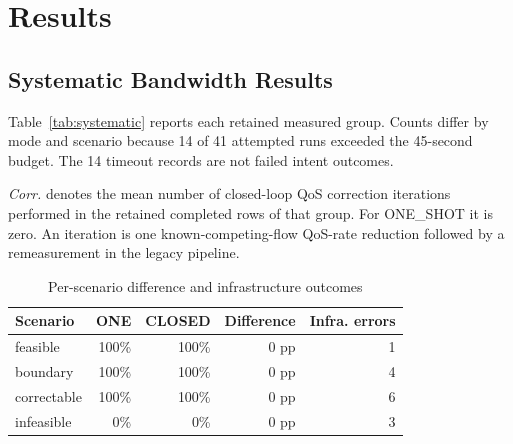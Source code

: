 \documentclass[conference]{IEEEtran}
\begin{document}
\section{Results}
\subsection{Systematic Bandwidth Results}
Table~\ref{tab:systematic} reports each retained measured group. Counts differ
by mode and scenario because 14 of 41 attempted runs exceeded the 45-second
budget. The 14 timeout records are not failed intent outcomes.

\begin{table}[t]
\caption{Retained systematic bandwidth sweep}
\label{tab:systematic}
\centering
\scriptsize
{}
\vspace{1mm}
\footnotesize\emph{Corr.} denotes the mean number of closed-loop QoS
correction iterations performed in the retained completed rows of that
group. For ONE\_SHOT it is zero. An iteration is one known-competing-flow
QoS-rate reduction followed by a remeasurement in the legacy pipeline.
\normalsize
\end{table}

\begin{table}[t]
\caption{Per-scenario difference and infrastructure outcomes}
\label{tab:infra}
\centering
\scriptsize
\begin{tabular}{lrrrr}
\toprule
Scenario & ONE & CLOSED & Difference & Infra. errors\\
\midrule
feasible & 100\% & 100\% & 0 pp & 1 \\
boundary & 100\% & 100\% & 0 pp & 4 \\
correctable & 100\% & 100\% & 0 pp & 6 \\
infeasible & 0\% & 0\% & 0 pp & 3 \\
\bottomrule
\end{tabular}
\end{table}
\end{document}
